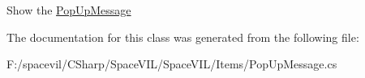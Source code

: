 Show the \mbox{\hyperlink{class_space_v_i_l_1_1_pop_up_message}{Pop\+Up\+Message}} 



The documentation for this class was generated from the following file\+:\begin{DoxyCompactItemize}
\item 
F\+:/spacevil/\+C\+Sharp/\+Space\+V\+I\+L/\+Space\+V\+I\+L/\+Items/Pop\+Up\+Message.\+cs\end{DoxyCompactItemize}
